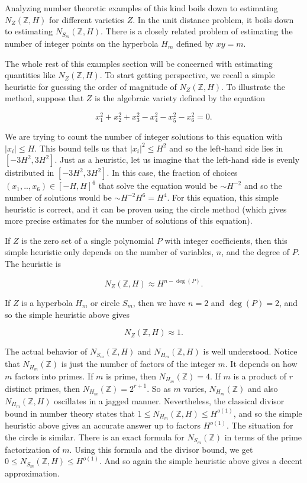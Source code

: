 \documentclass{amsart}
\newcommand{\ZZ}{\mathbb{Z}}
\newcommand{\heur}{\approx}
\begin{document}
Analyzing number theoretic examples of this kind boils down to estimating $N_Z(\ZZ, H)$ for different varieties $Z$.  In the unit distance problem, it boils down to estimating $N_{S_m}(\ZZ, H)$.  There is a closely related problem of estimating the number of integer points on the hyperbola $H_m$ defined by $xy = m$.  

The whole rest of this examples section will be concerned with estimating quantities like $N_Z(\ZZ, H)$.   To start getting perspective, we recall a simple heuristic for guessing the order of magnitude of $N_Z(\ZZ, H)$.  To illustrate the method, suppose that $Z$ is the algebraic variety defined by the equation

$$ x_1^2 + x_2^2 + x_3^2 - x_4^2 - x_5^2 - x_6^2 = 0. $$

\noindent We are trying to count the number of integer solutions to this equation with $|x_i| \le H$.  This bound tells us that $|x_i|^2 \le H^2$ and so the left-hand side lies in $[-3 H^2, 3H^2]$.  Just as a heuristic, let us imagine that the left-hand side is evenly distributed in $[-3H^2, 3H^2]$.  In this case, the fraction of choices $(x_1, .., x_6) \in [-H, H]^6$ that solve the equation would be $\sim H^{-2}$ and so the number of solutions would be $\sim H^{-2} H^6 = H^4$.  For this equation, this simple heuristic is correct, and it can be proven using the circle method (which gives more precise estimates for the number of solutions of this equation).

If $Z$ is the zero set of a single polynomial $P$ with integer coefficients, then this simple heuristic only depends on the number of variables, $n$, and the degree of $P$.  The heuristic is

$$ N_Z(\ZZ, H) \heur H^{n - \deg(P)}. $$

If $Z$ is a hyperbola $H_m$ or circle $S_m$, then we have $n=2$ and $\deg(P) = 2$, and so the simple heuristic above gives

$$ N_Z(\ZZ, H) \heur 1. $$

The actual behavior of $N_{S_m}(\ZZ, H)$ and $N_{H_m}(\ZZ, H)$ is well understood.  Notice that $N_{H_m}(\ZZ)$ is just the number of factors of the integer $m$.  It depends on how $m$ factors into primes.  If $m$ is prime, then $N_{H_m}(\ZZ) = 4$.  If $m$ is a product of $r$ distinct primes, then $N_{H_m}(\ZZ) = 2^{r+1}$.  So as $m$ varies, $N_{H_m}(\ZZ)$ and also $N_{H_m}(\ZZ, H)$ oscillates in a jagged manner.  Nevertheless, the classical divisor bound in number theory states that $1 \le N_{H_m}(\ZZ, H) \le H^{o(1)}$, and so the simple heuristic above gives an accurate answer up to factors $H^{o(1)}$.  The situation for the circle is similar.  There is an exact formula for $N_{S_m}(\ZZ)$ in terms of the prime factorization of $m$.  Using this formula and the divisor bound, we get $0 \le N_{S_m}(\ZZ, H) \le H^{o(1)}$.  And so again the simple heuristic above gives a decent approximation.  
\end{document}
